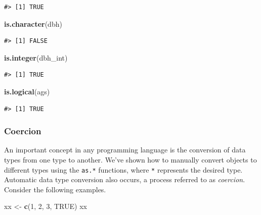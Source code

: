 \documentclass[
  11pt,
]{krantz}
\newenvironment{Shaded}{\begin{snugshade}}{\end{snugshade}}
\newcommand{\DecValTok}[1]{\textcolor[rgb]{0.00,0.00,0.81}{#1}}
\newcommand{\KeywordTok}[1]{\textcolor[rgb]{0.13,0.29,0.53}{\textbf{#1}}}
\newcommand{\NormalTok}[1]{#1}
\newcommand{\OtherTok}[1]{\textcolor[rgb]{0.56,0.35,0.01}{#1}}
\newcommand{\StringTok}[1]{\textcolor[rgb]{0.31,0.60,0.02}{#1}}
\theoremstyle{definition}
\theoremstyle{definition}
\theoremstyle{definition}
\theoremstyle{definition}
\theoremstyle{remark}
\begin{document}
\begin{verbatim}
#> [1] TRUE
\end{verbatim}

\begin{Shaded}
\begin{Highlighting}[]
\KeywordTok{is.character}\NormalTok{(dbh)}
\end{Highlighting}
\end{Shaded}

\begin{verbatim}
#> [1] FALSE
\end{verbatim}

\begin{Shaded}
\begin{Highlighting}[]
\KeywordTok{is.integer}\NormalTok{(dbh\_int)}
\end{Highlighting}
\end{Shaded}

\begin{verbatim}
#> [1] TRUE
\end{verbatim}

\begin{Shaded}
\begin{Highlighting}[]
\KeywordTok{is.logical}\NormalTok{(ags)}
\end{Highlighting}
\end{Shaded}

\begin{verbatim}
#> [1] TRUE
\end{verbatim}

\hypertarget{coercion}{%
\subsubsection{Coercion}\label{coercion}}

An important concept in any programming language is the conversion of data types from one type to another. We've shown how to manually convert objects to different types using the \texttt{as.*} functions, where \texttt{*} represents the desired type. Automatic data type conversion also occurs, a process referred to as \emph{coercion}. Consider the following examples.

\begin{Shaded}
\begin{Highlighting}[]
\NormalTok{xx \textless{}{-}}\StringTok{ }\KeywordTok{c}\NormalTok{(}\DecValTok{1}\NormalTok{, }\DecValTok{2}\NormalTok{, }\DecValTok{3}\NormalTok{, }\OtherTok{TRUE}\NormalTok{)}
\NormalTok{xx}
\end{Highlighting}
\end{Shaded}
\end{document}
